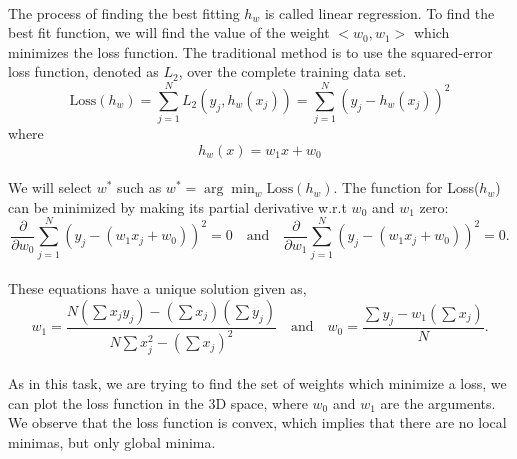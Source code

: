 \documentclass{article}
\begin{document}
        \paragraph{}
            The process of finding the best fitting $h_w$ is called linear regression.  To find the best fit function, we will find the value of the weight $<w_0, w_1>$ which minimizes the loss function. The traditional method is to use the squared-error loss function, denoted as $L_2$, over the complete training data set.
            \begin{equation*}
                \text{Loss}(h_w) = \sum_{j=1}^{N} L_2(y_j, h_w(x_j)) = \sum_{j=1}^{N} (y_j - h_w(x_j))^2
            \end{equation*}
            where 
                \begin{equation*}
                    h_w (x) = w_1 x + w_0
                \end{equation*}
        \paragraph{}
            We will select $w^*$ such as $w^* = \arg\min_w \text{Loss}(h_w)$. The function for Loss($h_w$) can be minimized by making its partial derivative w.r.t $w_0$ and $w_1$ zero:
                \begin{equation*}
                    \frac{\partial}{\partial w_0} \sum_{j=1}^{N} (y_j - (w_1 x_j + w_0))^2 = 0 \quad \text{and} \quad
\frac{\partial}{\partial w_1} \sum_{j=1}^{N} (y_j - (w_1 x_j + w_0))^2 = 0.
                \end{equation*}
        \paragraph{}   
            These equations have a unique solution given as,
            \begin{equation*}
                w_1 = \frac{N \left( \sum x_j y_j \right) - \left( \sum x_j \right) \left( \sum y_j \right)}{N \sum x_j^2 - \left( \sum x_j \right)^2} \quad \text{and} \quad w_0 = \frac{\sum y_j - w_1 \left( \sum x_j \right)}{N}.
            \end{equation*}

        \paragraph{}
            As in this task, we are trying to find the set of weights which minimize a loss, we can plot the loss function in the 3D space, where $w_0$ and $w_1$ are the arguments. We observe that  the loss function is convex, which implies that there are no local minimas, but only global minima.
\end{document}
